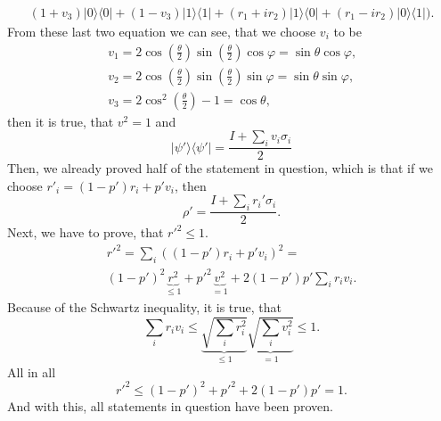 \documentclass[a4paper,12pt]{article}
\newcommand{\la}{\langle}
\newcommand{\ra}{\rangle}
\begin{document}
\begin{enumerate}[label=(\arabic*)]
\begin{gather}
                (1 + v_3) |0 \ra \la 0| +
                (1 - v_3) |1 \ra \la 1| +
                (r_1 + i r_2) |1 \ra \la 0| +
                (r_1 - i r_2) |0 \ra \la 1|) \textrm{.}
            \end{gather}
            From these last two equation we can see, that we choose $v_i$ to be
            \begin{gather}
                \nonumber
                v_1 = 2 \cos \left( \frac{\theta}{2} \right) \sin \left( \frac{\theta}{2} \right) \cos \varphi = \sin \theta \cos \varphi \textrm{,} \\
                \nonumber
                v_2 = 2 \cos \left( \frac{\theta}{2} \right) \sin \left( \frac{\theta}{2} \right) \sin \varphi = \sin \theta \sin \varphi \textrm{,} \\
                v_3 = 2 \cos^2 \left( \frac{\theta}{2} \right) - 1 = \cos \theta \textrm{,}
            \end{gather}
            then it is true, that $v^2 = 1$ and
            \begin{equation}
                | \psi' \ra \la \psi' | =
                \frac{I + \sum_i v_i \sigma_i}{2}
            \end{equation}
            Then, we already proved half of the statement in question, which is that if we choose $r'_i = (1 - p') r_i + p' v_i$, then
            \begin{equation}
                \rho' = \frac{I + \sum_i r_i' \sigma_i}{2} \textrm{.}
            \end{equation}
            Next, we have to prove, that $r'^2 \leq 1$.
            \begin{gather}
                \nonumber
                r'^2 = \sum_i ( (1 - p') r_i + p' v_i )^2 =\\
                (1 - p')^2 \underbrace{r^2}_{\leq 1} + p'^2 \underbrace{v^2}_{= 1} + 2(1 - p') p' \sum_i r_i v_i \textrm{.}
            \end{gather}
            Because of the Schwartz inequality, it is true, that
            \begin{equation}
                \sum_i r_i v_i \leq \underbrace{\sqrt{\sum_i r_i^2}}_{\leq 1} \underbrace{\sqrt{\sum_i v_i^2}}_{= 1} \leq 1 \textrm{.}
            \end{equation}
            All in all
            \begin{equation}
                r'^2 \leq (1 - p')^2 + p'^2 + 2(1 - p') p' = 1 \textrm{.}
            \end{equation}
            And with this, all statements in question have been proven.


\end{enumerate}
\end{document}
